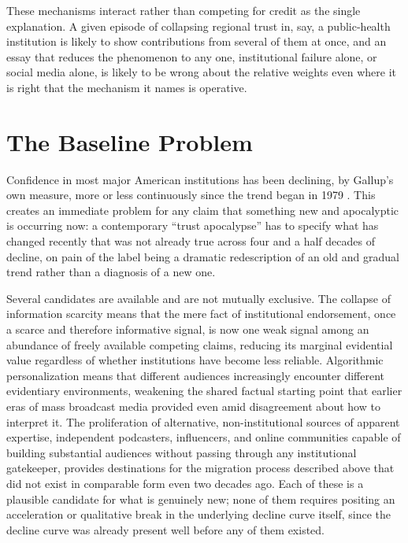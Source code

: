 \documentclass[11pt]{article}
\begin{document}
These mechanisms interact rather than competing for credit as the single explanation. A given episode of collapsing regional trust in, say, a public-health institution is likely to show contributions from several of them at once, and an essay that reduces the phenomenon to any one, institutional failure alone, or social media alone, is likely to be wrong about the relative weights even where it is right that the mechanism it names is operative.

\section{The Baseline Problem}

Confidence in most major American institutions has been declining, by Gallup's own measure, more or less continuously since the trend began in 1979 \citep{gallup2026}. This creates an immediate problem for any claim that something new and apocalyptic is occurring now: a contemporary ``trust apocalypse'' has to specify what has changed recently that was not already true across four and a half decades of decline, on pain of the label being a dramatic redescription of an old and gradual trend rather than a diagnosis of a new one.

Several candidates are available and are not mutually exclusive. The collapse of information scarcity means that the mere fact of institutional endorsement, once a scarce and therefore informative signal, is now one weak signal among an abundance of freely available competing claims, reducing its marginal evidential value regardless of whether institutions have become less reliable. Algorithmic personalization means that different audiences increasingly encounter different evidentiary environments, weakening the shared factual starting point that earlier eras of mass broadcast media provided even amid disagreement about how to interpret it. The proliferation of alternative, non-institutional sources of apparent expertise, independent podcasters, influencers, and online communities capable of building substantial audiences without passing through any institutional gatekeeper, provides destinations for the migration process described above that did not exist in comparable form even two decades ago. Each of these is a plausible candidate for what is genuinely new; none of them requires positing an acceleration or qualitative break in the underlying decline curve itself, since the decline curve was already present well before any of them existed.
\end{document}
